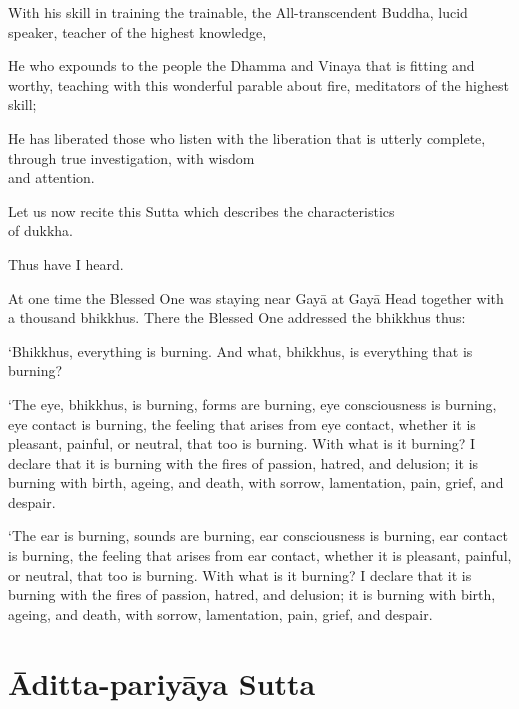 \setTocDelegatedPageNumber
\englishText
\renewcommand{\englishTitle}{The Fire Sermon}

\begin{leader}

With his skill in training the trainable, the All-transcendent Buddha,
lucid speaker, teacher of the highest knowledge,

He who expounds to the people the Dhamma and Vinaya that is fitting and
worthy, teaching with this wonderful parable about fire, meditators of
the highest skill;

He has liberated those who listen with the liberation that is utterly
complete, through true investigation, with wisdom\\ and attention.

Let us now recite this Sutta which describes the characteristics\\ of dukkha.

\end{leader}

Thus have I heard.

At one time the Blessed One was staying near Gayā at Gayā Head together
with a thousand bhikkhus. There the Blessed One addressed the bhikkhus
thus:

‘Bhikkhus, everything is burning. And what, bhikkhus, is everything
that is burning?

‘The eye, bhikkhus, is burning, forms are burning, eye consciousness is
burning, eye contact is burning, the feeling that arises from eye
contact, whether it is pleasant, painful, or neutral, that too is
burning. With what is it burning? I declare that it is burning with the
fires of passion, hatred, and delusion; it is burning with birth,
ageing, and death, with sorrow, lamentation, pain, grief, and despair.

\enlargethispage{2\baselineskip}

‘The ear is burning, sounds are burning, ear consciousness is burning,
ear contact is burning, the feeling that arises from ear contact,
whether it is pleasant, painful, or neutral, that too is burning. With
what is it burning? I declare that it is burning with the fires of
passion, hatred, and delusion; it is burning with birth, ageing, and
death, with sorrow, lamentation, pain, grief, and despair.

\chapterTocSubIndentTrue
\chapter{Āditta-pariyāya Sutta}%


